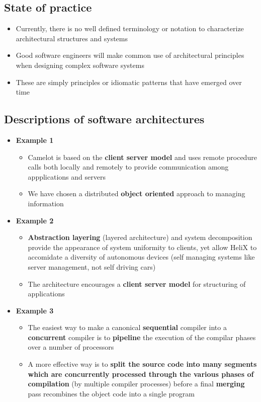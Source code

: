 \documentclass[12pt]{book}
\begin{document}
\subsection{State of practice}

\begin{itemize}
    \item Currently, there is no well defined terminology or notation to characterize architectural structures and systems
    \item Good software engineers will make common use of architectural principles when designing complex software systems
    \item These are simply principles or idiomatic patterns that have emerged over time
\end{itemize}

\subsection{Descriptions of software architectures}

\begin{itemize}
    \item \textbf{Example 1}
    \begin{itemize}
        \item Camelot is based on the \textbf{client server model} and uses remote procedure calls both locally and remotely to provide communication among appplications and servers
        \item We have chosen a distributed \textbf{object oriented} approach to managing information
    \end{itemize} 

    \item \textbf{Example 2}
    \begin{itemize}
        \item \textbf{Abstraction layering} (layered architecture) and system decomposition provide the appearance of system uniformity to clients, yet allow HeliX to accomidate a diversity of autonomous devices (self managing systems like server management, not self driving cars)
        \item The architecture encourages a \textbf{client server model} for structuring of applications
    \end{itemize} 

    \item \textbf{Example 3}
    \begin{itemize}
        \item The easiest way to make a canonical \textbf{sequential} compiler into a \textbf{concurrent} compiler is to \textbf{pipeline} the execution of the compilar phases over a number of processors
        \item A more effective way is to \textbf{split the source code into many segments which are concurrently processed through the various phases of compilation} (by multiple compiler processes) before a final \textbf{merging} pass recombines the object code into a single program
    \end{itemize} 
\end{itemize}
\end{document}
